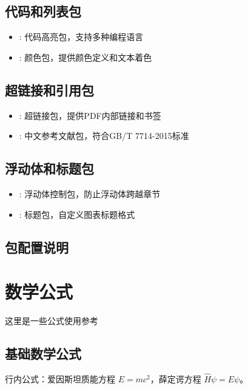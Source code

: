 \subsection{代码和列表包}

\begin{itemize}
    \item {}: 代码高亮包，支持多种编程语言
    \item {}: 颜色包，提供颜色定义和文本着色
\end{itemize}

\subsection{超链接和引用包}

\begin{itemize}
    \item {}: 超链接包，提供PDF内部链接和书签
    \item {}: 中文参考文献包，符合GB/T 7714-2015标准
\end{itemize}

\subsection{浮动体和标题包}

\begin{itemize}
    \item {}: 浮动体控制包，防止浮动体跨越章节
    \item {}: 标题包，自定义图表标题格式
\end{itemize}

\subsection{包配置说明}

\section{数学公式}
\label{sec:mathematics}

这里是一些公式使用参考

\subsection{基础数学公式}

行内公式：爱因斯坦质能方程 $E = mc^2$，薛定谔方程 $\hat{H}\psi = E\psi$。

